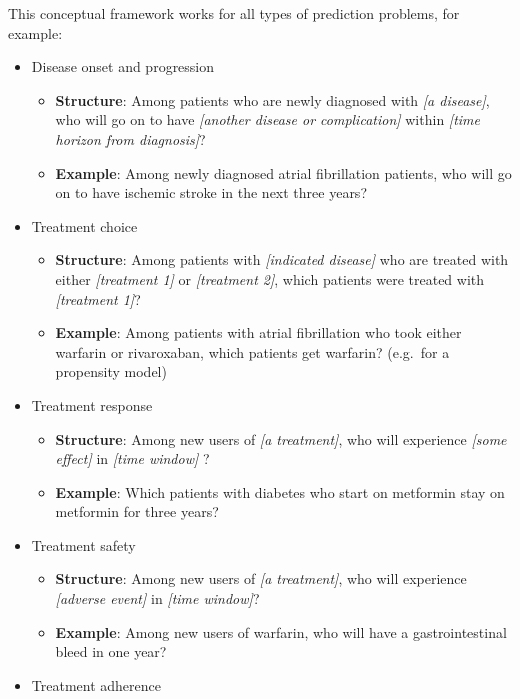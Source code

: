 \documentclass[11pt]{book}
\providecommand{\tightlist}{%
  \setlength{\itemsep}{0pt}\setlength{\parskip}{0pt}}
\theoremstyle{definition}
\theoremstyle{definition}
\theoremstyle{definition}
\theoremstyle{remark}
\begin{document}
This conceptual framework works for all types of prediction problems, for example:

\begin{itemize}
\tightlist
\item
  Disease onset and progression

  \begin{itemize}
  \tightlist
  \item
    \textbf{Structure}: Among patients who are newly diagnosed with \emph{{[}a disease{]}}, who will go on to have \emph{{[}another disease or complication{]}} within \emph{{[}time horizon from diagnosis{]}}?
  \item
    \textbf{Example}: Among newly diagnosed atrial fibrillation patients, who will go on to have ischemic stroke in the next three years?
  \end{itemize}
\item
  Treatment choice

  \begin{itemize}
  \tightlist
  \item
    \textbf{Structure}: Among patients with \emph{{[}indicated disease{]}} who are treated with either \emph{{[}treatment 1{]}} or \emph{{[}treatment 2{]}}, which patients were treated with \emph{{[}treatment 1{]}}?
  \item
    \textbf{Example}: Among patients with atrial fibrillation who took either warfarin or rivaroxaban, which patients get warfarin? (e.g.~for a propensity model)
  \end{itemize}
\item
  Treatment response

  \begin{itemize}
  \tightlist
  \item
    \textbf{Structure}: Among new users of \emph{{[}a treatment{]}}, who will experience \emph{{[}some effect{]}} in \emph{{[}time window{]}} ?
  \item
    \textbf{Example}: Which patients with diabetes who start on metformin stay on metformin for three years?
  \end{itemize}
\item
  Treatment safety

  \begin{itemize}
  \tightlist
  \item
    \textbf{Structure}: Among new users of \emph{{[}a treatment{]}}, who will experience \emph{{[}adverse event{]}} in \emph{{[}time window{]}}?
  \item
    \textbf{Example}: Among new users of warfarin, who will have a gastrointestinal bleed in one year?
  \end{itemize}
\item
  Treatment adherence


\end{itemize}
\end{document}
